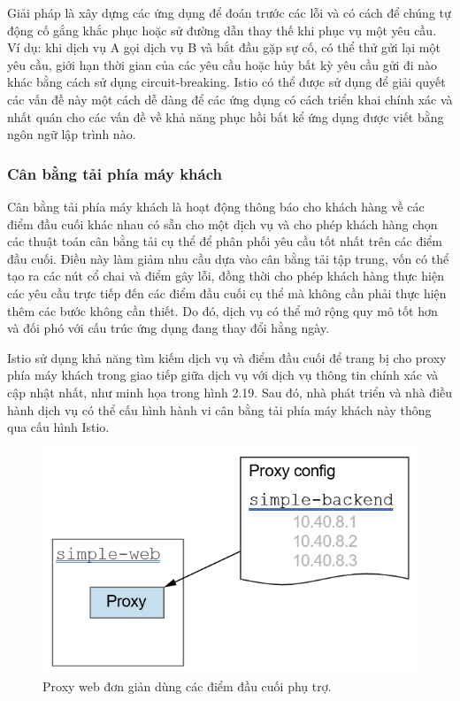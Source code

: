 \documentclass[12pt,a4paper]{report}
\begin{document}
Giải pháp là xây dựng các ứng dụng để đoán trước các lỗi và có cách để chúng tự động cố gắng khắc phục hoặc sử đường dẫn thay thế khi phục vụ một yêu cầu. Ví dụ: khi dịch vụ A gọi dịch vụ B và bắt đầu gặp sự cố, có thể thử gửi lại một yêu cầu, giới hạn thời gian của các yêu cầu hoặc hủy bất kỳ yêu cầu gửi đi nào khác bằng cách sử dụng circuit-breaking. Istio có thể được sử dụng để giải quyết các vấn đề này một cách dễ dàng để các ứng dụng có cách triển khai chính xác và nhất quán cho các vấn đề về khả năng phục hồi bất kể ứng dụng được viết bằng ngôn ngữ lập trình nào.

			\subsubsection{Cân bằng tải phía máy khách}
\hspace{0.6cm}Cân bằng tải phía máy khách là hoạt động thông báo cho khách hàng về các điểm đầu cuối khác nhau có sẵn cho một dịch vụ và cho phép khách hàng chọn các thuật toán cân bằng tải cụ thể để phân phối yêu cầu tốt nhất trên các điểm đầu cuối. Điều này làm giảm nhu cầu dựa vào cân bằng tải tập trung, vốn có thể tạo ra các nút cổ chai và điểm gây lỗi, đồng thời cho phép khách hàng thực hiện các yêu cầu trực tiếp đến các điểm đầu cuối cụ thể mà không cần phải thực hiện thêm các bước không cần thiết. Do đó, dịch vụ có thể mở rộng quy mô tốt hơn và đối phó với cấu trúc ứng dụng đang thay đổi hằng ngày.

Istio sử dụng khả năng tìm kiếm dịch vụ và điểm đầu cuối để trang bị cho proxy phía máy khách trong giao tiếp giữa dịch vụ với dịch vụ thông tin chính xác và cập nhật nhất, như minh họa trong hình 2.19. Sau đó, nhà phát triển và nhà điều hành dịch vụ có thể cấu hình hành vi cân bằng tải phía máy khách này thông qua cấu hình Istio.
\begin{figure}[h]
	\centering
	\includegraphics[width=0.7\linewidth]{Pics/2.2.3-p2}
	\caption{Proxy web đơn giản dùng các điểm đầu cuối phụ trợ.}
	\label{fig:2.2.3-2}
\end{figure}
\end{document}

